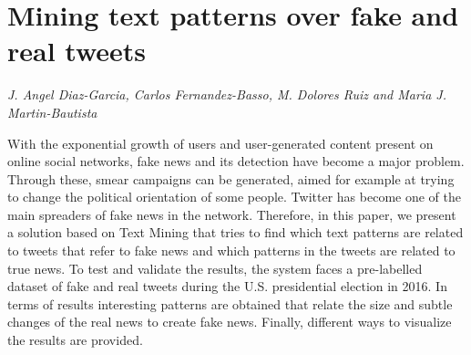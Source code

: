 \documentclass[../booklet.tex]{subfiles}
\begin{document}
\section[Mining text patterns over fake and real tweets. {\it J. Angel Diaz-Garcia, Carlos Fernandez-Basso, M. Dolores Ruiz and Maria J. Martin-Bautista}]{Mining text patterns over fake and real tweets}
   

\begin{center}
  {\it J. Angel Diaz-Garcia, Carlos Fernandez-Basso, M. Dolores Ruiz and Maria J. Martin-Bautista}
\end{center}

\vskip 0.8cm


	
With the exponential growth of users and user-generated content present on online social networks, fake  news and its detection have become a major problem. Through these, smear campaigns can be generated, aimed for example at trying to change the political orientation of some people. Twitter has become one of the main spreaders of fake news in the network. Therefore, in this paper, we present a solution based on Text Mining that tries to find which text patterns are related to tweets that refer to fake news and which patterns in the tweets are related to true news. To test and validate the results, the system faces a pre-labelled dataset of fake and real tweets during the U.S. presidential election in 2016. In terms of results interesting patterns are obtained that relate the size and subtle changes of the real news to create fake news. Finally, different ways to visualize the results are provided. 	

\end{document}
